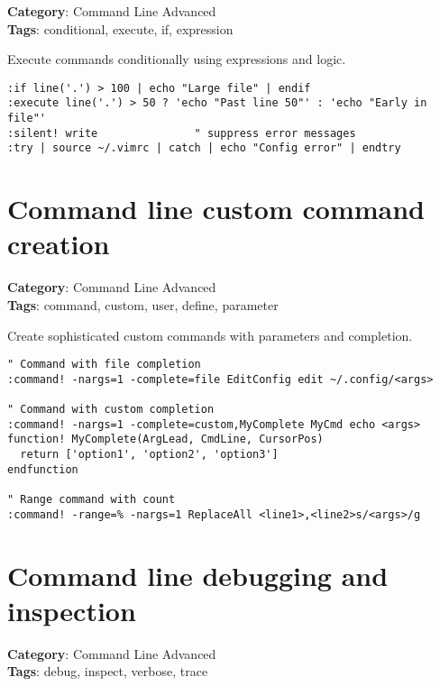 {{{{\textbf{Category}: Command Line Advanced\\ \textbf{Tags}: conditional, execute, if, expression
\vspace{0.5cm}

Execute commands conditionally using expressions and logic.

\begin{Exa*}{}
\begin{Verbatim}[fontsize=\footnotesize, breaklines, breakanywhere]
:if line('.') > 100 | echo "Large file" | endif
:execute line('.') > 50 ? 'echo "Past line 50"' : 'echo "Early in file"'
:silent! write               " suppress error messages
:try | source ~/.vimrc | catch | echo "Config error" | endtry
\end{Verbatim}
\end{Exa*}

\section{Command line custom command creation}

\textbf{Category}: Command Line Advanced\\ \textbf{Tags}: command, custom, user, define, parameter
\vspace{0.5cm}

Create sophisticated custom commands with parameters and completion.

\begin{Exa*}{}
\begin{Verbatim}[fontsize=\footnotesize, breaklines, breakanywhere]
" Command with file completion
:command! -nargs=1 -complete=file EditConfig edit ~/.config/<args>

" Command with custom completion
:command! -nargs=1 -complete=custom,MyComplete MyCmd echo <args>
function! MyComplete(ArgLead, CmdLine, CursorPos)
  return ['option1', 'option2', 'option3']
endfunction

" Range command with count
:command! -range=% -nargs=1 ReplaceAll <line1>,<line2>s/<args>/g
\end{Verbatim}
\end{Exa*}

\section{Command line debugging and inspection}

\textbf{Category}: Command Line Advanced\\ \textbf{Tags}: debug, inspect, verbose, trace
\vspace{0.5cm}

}}}}
